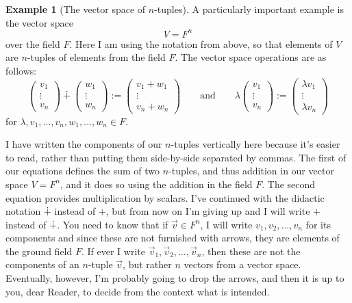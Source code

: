 \documentclass[11pt]{amsbook}
\theoremstyle{definition}
\newtheorem{ex}[theorem]{Example}
\begin{document}
\begin{ex}[The vector space of $n$-tuples] \label{ntups} A particularly important example is the vector space $$V = F^n$$ over the field $F$. Here I am using the notation from above, so that elements of $V$ are $n$-tuples of elements from the field $F$. The vector space operations are as follows:
$$
\begin{pmatrix}
v_1 \\ \vdots \\ v_n
\end{pmatrix}
\dotplus
\begin{pmatrix}
w_1 \\ \vdots \\ w_n
\end{pmatrix}
:=
\begin{pmatrix}
v_1+w_1 \\ \vdots \\ v_n+w_n
\end{pmatrix}
\qquad \text{and} \qquad
\lambda
\begin{pmatrix}
v_1 \\ \vdots \\ v_n
\end{pmatrix}
 :=
\begin{pmatrix}
\lambda v_1 \\ \vdots \\ \lambda v_n
\end{pmatrix}
$$
for $\lambda, v_1, \ldots , v_n, w_1, \ldots , w_n\in F$.
\end{ex}
I have written the components of our $n$-tuples vertically here because it's easier to read, rather than putting them side-by-side separated by commas. The first of our equations defines the sum of two $n$-tuples, and thus addition in our vector space $V=F^n$, and it does so using the addition in the field $F$. The second equation provides multiplication by scalars. I've continued with the didactic notation $\dotplus$ instead of $+$, but from now on I'm giving up and I will write $+$ instead of $\dotplus$. You need to know that if $\vec{v}\in F^n$, I will write $v_1, v_2, \ldots , v_n$ for its components and since these are not furnished with arrows, they are elements of the ground field $F$. If ever I write $\vec{v}_1, \vec{v}_2, \ldots ,\vec{v}_n$, then these are not the components of an $n$-tuple $\vec{v}$, but rather $n$ vectors from a vector space. Eventually, however, I'm probably going to drop the arrows, and then it is up to you, dear Reader, to decide from the context what is intended.
\end{document}
